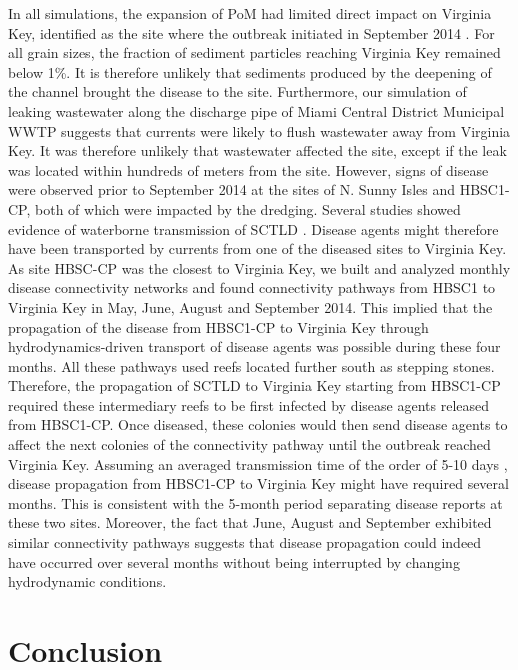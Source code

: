In all simulations, the expansion of PoM had limited direct impact on Virginia Key, identified as the site where the outbreak initiated in September 2014 \citep{precht2016unprecedented}. For all grain sizes, the fraction of sediment particles reaching Virginia Key remained below 1\%. It is therefore unlikely that sediments produced by the deepening of the channel brought the disease to the site. Furthermore, our simulation of leaking wastewater along the discharge pipe of Miami Central District Municipal WWTP suggests that currents were likely to flush wastewater away from Virginia Key. It was therefore unlikely that wastewater affected the site, except if the leak was located within hundreds of meters from the site. However, signs of disease were observed prior to September 2014 at the sites of N. Sunny Isles and HBSC1-CP, both of which were impacted by the dredging. Several studies showed evidence of waterborne transmission of SCTLD \citep{aeby2019pathogenesis,dobbelaere2020coupled,eaton2021measuring,meiling2021variable}. Disease agents might therefore have been transported by currents from one of the diseased sites to Virginia Key. As site HBSC-CP was the closest to Virginia Key, we built and analyzed monthly disease connectivity networks and found connectivity pathways from HBSC1 to Virginia Key in May, June, August and September 2014. This implied that the propagation of the disease from HBSC1-CP to Virginia Key through hydrodynamics-driven transport of disease agents was possible during these four months. All these pathways used reefs located further south as stepping stones. Therefore, the propagation of SCTLD to Virginia Key starting from HBSC1-CP required these intermediary reefs to be first infected by disease agents released from HBSC1-CP. Once diseased, these colonies would then send disease agents to affect the next colonies of the connectivity pathway until the outbreak reached Virginia Key. Assuming an averaged transmission time of the order of 5-10 days \citep{dobbelaere2020coupled}, disease propagation from HBSC1-CP to Virginia Key might have required several months. This is consistent with the 5-month period separating disease reports at these two sites. Moreover, the fact that June, August and September exhibited similar connectivity pathways suggests that disease propagation could indeed have occurred over several months without being interrupted by changing hydrodynamic conditions.

\section{Conclusion}

